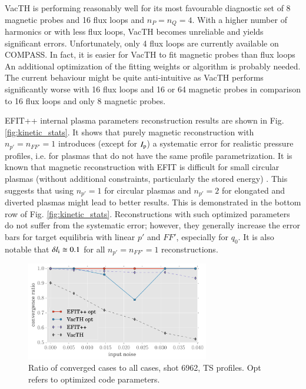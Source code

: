 VacTH is performing reasonably well for its most favourable diagnostic set of 8 magnetic probes and 16 flux loops and $n_P = n_Q = 4$. With a higher number of harmonics or with less flux loops, VacTH becomes unreliable and yields significant errors. Unfortunately, only 4 flux loops are currently available on COMPASS. In fact, it is easier for VacTH to fit magnetic probes than flux loops
An additional optimization of the fitting weights or algorithm is probably needed. The current behaviour might be quite anti-intuitive as VacTH performs significantly worse with 16 flux loops and 16 or 64 magnetic probes in comparison to 16 flux loops and only 8 magnetic probes. 

EFIT++ internal plasma parameters reconstruction results are shown in Fig. \ref{fig:kinetic_stats}. It shows that purely magnetic reconstruction with $n_{p'}=n_{FF'}=1$ introduces (except for $I_{\rm{p}}$) a systematic error for realistic pressure profiles, i.e. for plasmas that do not have the same profile parametrization. 
It is known that magnetic reconstruction with EFIT is difficult for small circular plasmas (without additional constraints, particularly the stored energy) \cite{efit1985}.
This suggests that using $n_{p'}=1$ for circular plasmas and $n_{p'}=2$ for elongated and diverted plasmas might lead to better results. This is demonstrated in the bottom row of Fig. \ref{fig:kinetic_stats}.
Reconstructions with such optimized parameters do not suffer from the systematic error; however, they generally increase the error bars for target equilibria with linear $p'$ and $FF'$, especially for $q_0$. It is also notable that $\delta l_{\rm{i}} \cong 0.1$ for all $n_{p'}=n_{FF'}=1$ reconstructions.

\begin{figure}
\centering   %
\hfill{}
\includegraphics[width=8cm]{figures/convergence_ratio_6962.pdf}
\hfill{}
\caption{Ratio of converged cases to all cases, shot 6962, TS profiles. Opt refers to optimized code parameters.}
\label{fig:convergence_ratio}
\end{figure}

